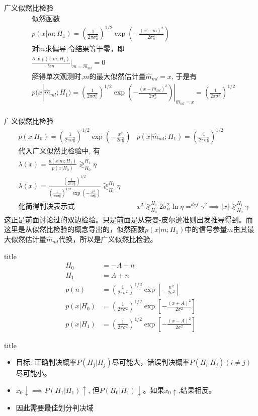 \begin{frame}{广义似然比检验}
\begin{align*}
&\text{似然函数}\\
&p(x|m;H_1)=(\frac{1}{2\pi\sigma_n^2})^{1/2}\exp(-\frac{(x-m)^2}{2\sigma_n^2})\\
&\text{对$m$求偏导,令结果等于零，即} \\
&\frac{\partial\ln p(x|m;H_1)}{\partial m}|_{m=\widehat{m}_{ml}}=0\\
&\text{解得单次观测时,$m$的最大似然估计量$\widehat{m}_{ml}=x$, 于是有 }\\
&p(x|\widehat{m}_{ml};H_1)=(\frac{1}{2\pi\sigma_n^2})^{1/2}\exp(-\frac{(x-\widehat{m}_{ml})^2}{2\sigma_n^2})|_{\widehat{m}_{ml}=x}=(\frac{1}{2\pi\sigma_n^2})^{1/2}\\
\end{align*}
\end{frame}
\begin{frame}{广义似然比检验}
\begin{align*}
&p(x|H_0)=(\frac{1}{2\pi\sigma_n^2})^{1/2}\exp(-\frac{x^2}{2\sigma_n^2})
&p(x|\widehat{m}_{ml};H_1)=(\frac{1}{2\pi\sigma_n^2})^{1/2}\\
&\text{代入广义似然比检验中, 有}\\
&\lambda(x)=\frac{p(x|m; H_1)}{p(x|H_0)}\mathop{\gtrless}_{H_0}^{H_1}\eta\\
&\lambda(x)=\frac{(\frac{1}{2\pi\sigma_n^2})^{1/2}}{(\frac{1}{2\pi\sigma_n^2})^{1/2}\exp(-\frac{x^2}{2\sigma_n^2})}\mathop{\gtrless}_{H_0}^{H_1}\eta\\
&\text{化简得判决表示式}
&x^2\mathop{\gtrless}_{H_0}^{H_1}2\sigma_n^2\ln\eta\mathop{=}^{def}\gamma^2 \implies |x|\mathop{\gtrless}_{H_0}^{H_1}\gamma
\end{align*}
这正是前面讨论过的双边检验。只是前面是从奈曼-皮尔逊准则出发推导得到。而这里是从似然比检验的概念导出的，似然函数$p(x|m;H_1)$中的信号参量$m$由其最大似然估计量$\widehat{m}_{ml}$代换，所以是广义似然比检验。
\end{frame}

\begin{frame}{title}
\begin{align*}
H_0&=-A+n\\
H_1&=A+n\\
p(n)&=\left(\frac{1}{2\pi\sigma^2}\right)^{1/2}\exp\left[-\frac{n^2}{2\sigma^2}\right]\\
p(x|H_0)&=\left(\frac{1}{2\pi\sigma^2}\right)^{1/2}\exp\left[-\frac{(x+A)^2}{2\sigma^2}\right]\\
p(x|H_1)&=\left(\frac{1}{2\pi\sigma^2}\right)^{1/2}\exp\left[-\frac{(x-A)^2}{2\sigma^2}\right]
\end{align*}
\end{frame}

\begin{frame}{title}
\begin{itemize}
	\item 目标: 正确判决概率$P(H_j|H_j)$尽可能大，错误判决概率$P(H_i|H_j)(i\ne j)$尽可能小。
	\item $x_0\downarrow\implies P(H_1|H_1)\uparrow$, 但$P(H_0|H_1)\downarrow$。如果$x_0\uparrow$,结果相反。
	\item 因此需要最佳划分判决域
\end{itemize}
\end{frame}




